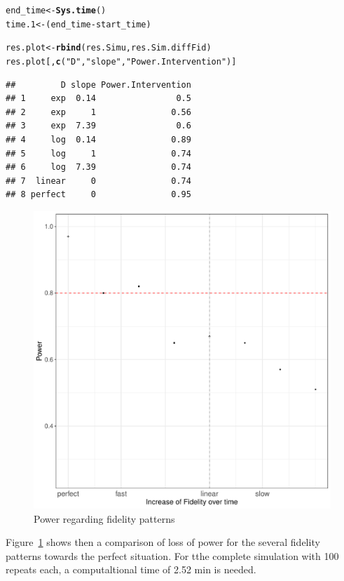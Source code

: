 \documentclass{article}\usepackage[]{graphicx}\usepackage[]{color}
\makeatletter
\def\maxwidth{ %
  \ifdim\Gin@nat@width>\linewidth
    \linewidth
  \else
    \Gin@nat@width
  \fi
}
\newcommand{\hlstr}[1]{\textcolor[rgb]{0.192,0.494,0.8}{#1}}%
\newcommand{\hlopt}[1]{\textcolor[rgb]{0,0,0}{#1}}%
\newcommand{\hlstd}[1]{\textcolor[rgb]{0.345,0.345,0.345}{#1}}%
\newcommand{\hlkwb}[1]{\textcolor[rgb]{0.69,0.353,0.396}{#1}}%
\newcommand{\hlkwd}[1]{\textcolor[rgb]{0.737,0.353,0.396}{\textbf{#1}}}%
\newenvironment{kframe}{%
 \def\at@end@of@kframe{}%
 \ifinner\ifhmode%
  \def\at@end@of@kframe{\end{minipage}}%
  \begin{minipage}{\columnwidth}%
 \fi\fi%
 \def\FrameCommand##1{\hskip\@totalleftmargin \hskip-\fboxsep
 \colorbox{shadecolor}{##1}\hskip-\fboxsep
     \hskip-\linewidth \hskip-\@totalleftmargin \hskip\columnwidth}%
 \MakeFramed {\advance\hsize-\width
   \@totalleftmargin\z@ \linewidth\hsize
   \@setminipage}}%
 {\par\unskip\endMakeFramed%
 \at@end@of@kframe}
\newenvironment{knitrout}{}{} %
\makeatother
\begin{document}
\begin{knitrout}
\begin{kframe}
\begin{alltt}
\hlstd{end_time} \hlkwb{<-} \hlkwd{Sys.time}\hlstd{()}
\hlstd{time.1}\hlkwb{<-}\hlstd{(end_time} \hlopt{-} \hlstd{start_time)}

\hlstd{res.plot}\hlkwb{<-}\hlkwd{rbind}\hlstd{(res.Simu,res.Sim.diffFid)}
\hlstd{res.plot[,}\hlkwd{c}\hlstd{(}\hlstr{"D"}\hlstd{,}\hlstr{"slope"}\hlstd{,}\hlstr{"Power.Intervention"}\hlstd{)]}
\end{alltt}
\begin{verbatim}
##         D slope Power.Intervention
## 1     exp  0.14                0.5
## 2     exp     1               0.56
## 3     exp  7.39                0.6
## 4     log  0.14               0.89
## 5     log     1               0.74
## 6     log  7.39               0.74
## 7  linear     0               0.74
## 8 perfect     0               0.95
\end{verbatim}
\end{kframe}
\end{knitrout}





\begin{knitrout}
\color{fgcolor}\begin{figure}
\includegraphics[width=\maxwidth]{figure/FidelityPatternsPlot_Several-1} \caption[Power regarding fidelity patterns]{Power regarding fidelity patterns}\label{fig:FidelityPatternsPlot.Several}
\end{figure}


\end{knitrout}

Figure~\ref{fig:FidelityPatternsPlot.Several} shows then a comparison of loss of power for the several fidelity patterns towards the perfect situation.
For tthe complete simulation with 100 repeats each, a computaltional time of 2.52  min is needed.
\end{document}
